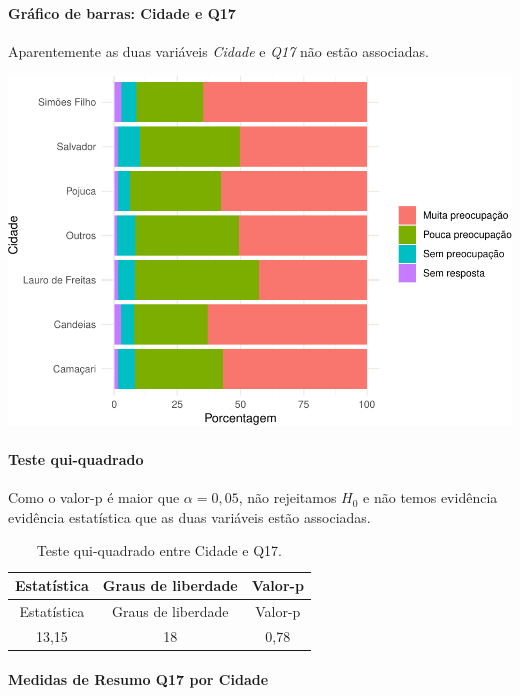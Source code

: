 \documentclass[]{article}
\let\oldparagraph\paragraph
\renewcommand{\paragraph}[1]{\oldparagraph{#1}\mbox{}}
\begin{document}
\hypertarget{gruxe1fico-de-barras-cidade-e-q17}{%
\paragraph{Gráfico de barras: Cidade e Q17}\label{gruxe1fico-de-barras-cidade-e-q17}}

Aparentemente as duas variáveis \emph{Cidade} e \emph{Q17} não estão associadas.

\begin{center}\includegraphics[width=0.75\linewidth]{relatorio_files/figure-latex/unnamed-chunk-182-1} \end{center}

\hypertarget{teste-qui-quadrado-18}{%
\paragraph{Teste qui-quadrado}\label{teste-qui-quadrado-18}}

Como o valor-p é maior que \(\alpha=0,05\), não rejeitamos \(H_0\) e não temos evidência evidência estatística que as duas variáveis estão associadas.

\begin{longtable}[]{@{}ccc@{}}
\caption{\label{tab:unnamed-chunk-183}Teste qui-quadrado entre Cidade e Q17.}\tabularnewline
\toprule
Estatística & Graus de liberdade & Valor-p\tabularnewline
\midrule
\endfirsthead
\toprule
Estatística & Graus de liberdade & Valor-p\tabularnewline
\midrule
\endhead
13,15 & 18 & 0,78\tabularnewline
\bottomrule
\end{longtable}

\cleardoublepage

\hypertarget{medidas-de-resumo-q17-por-cidade}{%
\paragraph{Medidas de Resumo Q17 por Cidade}\label{medidas-de-resumo-q17-por-cidade}}
\end{document}

